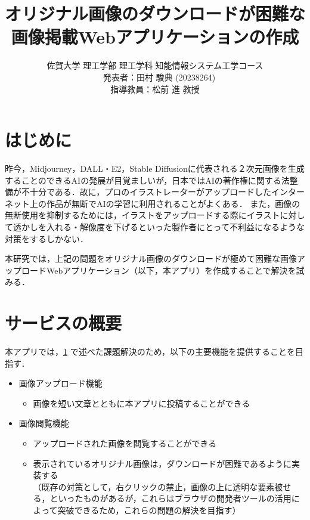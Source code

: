 ﻿\documentclass[twocolumn,a4j]{jarticle}
\title{
  オリジナル画像のダウンロードが困難な\\画像掲載Webアプリケーションの作成
}
\author{
  佐賀大学 理工学部 理工学科 知能情報システム工学コース\\
  　発表者：田村 駿典 (20238264)\\
  指導教員：松前 進 教授
}
\begin{document}
\date{\empty}
\maketitle
\thispagestyle{empty}

\section{はじめに}\label{sec:sec1}

昨今，Midjourney，DALL・E2，Stable Diffusionに代表される２次元画像を生成することのできるAIの発展が目覚ましいが，日本ではAIの著作権に関する法整備が不十分である．故に，プロのイラストレーターがアップロードしたインターネット上の作品が無断でAIの学習に利用されることがよくある\cite{nhk}．
また，画像の無断使用を抑制するためには，イラストをアップロードする際にイラストに対して透かしを入れる・解像度を下げるといった製作者にとって不利益になるような対策をするしかない．\par
本研究では，上記の問題をオリジナル画像のダウンロードが極めて困難な画像アップロードWebアプリケーション（以下，本アプリ）を作成することで解決を試みる．



\section{サービスの概要}
本アプリでは，\ref{sec:sec1} で述べた課題解決のため，以下の主要機能を提供することを目指す．
\begin{itemize}
  \item 画像アップロード機能
        \setlength{\parskip}{0cm}
        \begin{itemize}
          \item 画像を短い文章とともに本アプリに投稿することができる
        \end{itemize}
  \item 画像閲覧機能
        \begin{itemize}
          \item アップロードされた画像を閲覧することができる
          \item 表示されているオリジナル画像は，ダウンロードが困難であるように実装する\\（既存の対策として，右クリックの禁止，画像の上に透明な要素被せる，といったものがあるが，これらはブラウザの開発者ツールの活用によって突破できるため，これらの問題の解決を目指す）
        \end{itemize}
\end{itemize}
\end{document}
